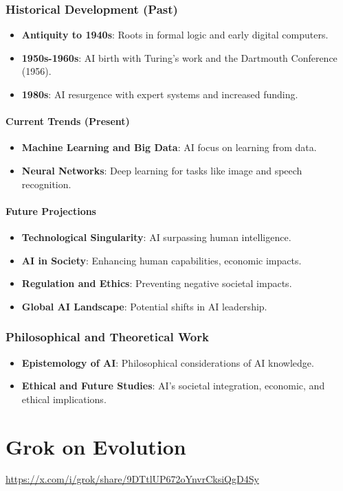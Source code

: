 \documentclass{book}
\begin{document}
\subsection{Historical Development (Past)}
\begin{itemize}
    \item \textbf{Antiquity to 1940s}: Roots in formal logic and early digital computers.
    \item \textbf{1950s-1960s}: AI birth with Turing's work and the Dartmouth Conference (1956).
    \item \textbf{1980s}: AI resurgence with expert systems and increased funding.
\end{itemize}

\subsubsection{Current Trends (Present)}
\begin{itemize}
    \item \textbf{Machine Learning and Big Data}: AI focus on learning from data.
    \item \textbf{Neural Networks}: Deep learning for tasks like image and speech recognition.
\end{itemize}

\subsubsection{Future Projections}
\begin{itemize}
    \item \textbf{Technological Singularity}: AI surpassing human intelligence.
    \item \textbf{AI in Society}: Enhancing human capabilities, economic impacts.
    \item \textbf{Regulation and Ethics}: Preventing negative societal impacts.
    \item \textbf{Global AI Landscape}: Potential shifts in AI leadership.
\end{itemize}

\subsection{Philosophical and Theoretical Work}

\begin{itemize}
    \item \textbf{Epistemology of AI}: Philosophical considerations of AI knowledge.
    \item \textbf{Ethical and Future Studies}: AI's societal integration, economic, and ethical implications.
\end{itemize}

\chapter{Grok on Evolution}

\url{https://x.com/i/grok/share/9DTtlUP672oYnvrCksiQgD4Sy}
\end{document}
